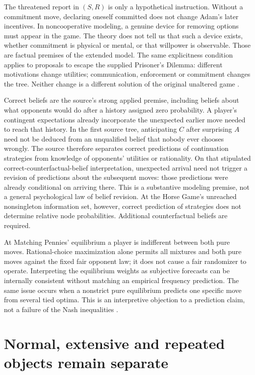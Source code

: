The threatened report in \((S,R)\) is only a hypothetical instruction.
Without a commitment move, declaring oneself committed does not change
Adam's later incentives. In noncooperative modeling, a genuine device
for removing options must appear in the game. The theory does not tell
us that such a device exists, whether commitment is physical or mental,
or that willpower is observable. Those are factual premises of the
extended model. The same explicitness condition applies to proposals
to escape the supplied Prisoner's Dilemma: different motivations change
utilities; communication, enforcement or commitment changes the tree.
Neither change is a different solution of the original unaltered game
\parencite[pp.~539--540]{AlbertKliemt2021ClassicalGameTheory}.

Correct beliefs are the source's strong applied premise, including
beliefs about what opponents would do after a history assigned zero
probability. A player's contingent expectations already incorporate
the unexpected earlier move needed to reach that history. In the first
source tree, anticipating \(C\) after surprising \(A\) need not
be deduced from an unqualified belief that nobody ever chooses wrongly.
The source therefore separates correct predictions of continuation
strategies from knowledge of opponents' utilities or rationality.
On that stipulated correct-counterfactual-belief interpretation,
unexpected arrival need not trigger a revision of predictions about
the subsequent moves: those predictions were already conditional
on arriving there. This is a substantive modeling premise, not a
general psychological law of belief revision.
At the Horse Game's unreached nonsingleton information set, however,
correct prediction of strategies does not determine relative node
probabilities. Additional counterfactual beliefs are required.

At Matching Pennies' equilibrium a player is indifferent between
both pure moves. Rational-choice maximization alone permits all
mixtures and both pure moves against the fixed fair opponent law;
it does not cause a fair randomizer to operate. Interpreting the
equilibrium weights as subjective forecasts can be internally
consistent without matching an empirical frequency prediction.
The same issue occurs when a nonstrict pure equilibrium predicts one
specific move from several tied optima. This is an interpretive
objection to a prediction claim, not a failure of the Nash inequalities
\parencite[pp.~538--539]{AlbertKliemt2021ClassicalGameTheory}.

\section{Normal, extensive and repeated objects remain separate}

